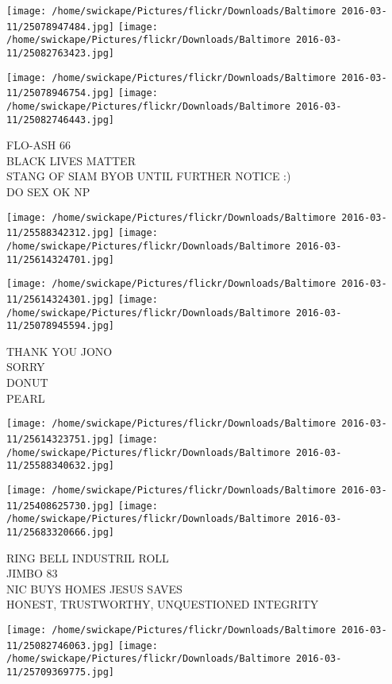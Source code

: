 \documentclass[10pt,letterpaper]{article}
\begin{document}
\texttt{[image: /home/swickape/Pictures/flickr/Downloads/Baltimore 2016-03-11/25078947484.jpg]}
\texttt{[image: /home/swickape/Pictures/flickr/Downloads/Baltimore 2016-03-11/25082763423.jpg]}

\texttt{[image: /home/swickape/Pictures/flickr/Downloads/Baltimore 2016-03-11/25078946754.jpg]}
\texttt{[image: /home/swickape/Pictures/flickr/Downloads/Baltimore 2016-03-11/25082746443.jpg]}

FLO{-}ASH 66\\
BLACK LIVES MATTER\\
STANG OF SIAM BYOB UNTIL FURTHER NOTICE :)\\
DO SEX OK NP\\
\pagebreak

\texttt{[image: /home/swickape/Pictures/flickr/Downloads/Baltimore 2016-03-11/25588342312.jpg]}
\texttt{[image: /home/swickape/Pictures/flickr/Downloads/Baltimore 2016-03-11/25614324701.jpg]}

\texttt{[image: /home/swickape/Pictures/flickr/Downloads/Baltimore 2016-03-11/25614324301.jpg]}
\texttt{[image: /home/swickape/Pictures/flickr/Downloads/Baltimore 2016-03-11/25078945594.jpg]}

THANK YOU JONO\\
SORRY\\
DONUT\\
PEARL\\
\pagebreak

\texttt{[image: /home/swickape/Pictures/flickr/Downloads/Baltimore 2016-03-11/25614323751.jpg]}
\texttt{[image: /home/swickape/Pictures/flickr/Downloads/Baltimore 2016-03-11/25588340632.jpg]}

\texttt{[image: /home/swickape/Pictures/flickr/Downloads/Baltimore 2016-03-11/25408625730.jpg]}
\texttt{[image: /home/swickape/Pictures/flickr/Downloads/Baltimore 2016-03-11/25683320666.jpg]}

RING BELL INDUSTRIL ROLL\\
JIMBO 83\\
NIC BUYS HOMES JESUS SAVES\\
HONEST, TRUSTWORTHY, UNQUESTIONED INTEGRITY\\
\pagebreak

\texttt{[image: /home/swickape/Pictures/flickr/Downloads/Baltimore 2016-03-11/25082746063.jpg]}
\texttt{[image: /home/swickape/Pictures/flickr/Downloads/Baltimore 2016-03-11/25709369775.jpg]}
\end{document}
